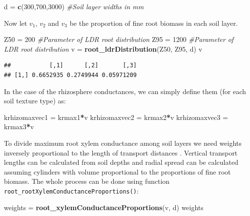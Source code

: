 \documentclass[]{book}
\newenvironment{Shaded}{\begin{snugshade}}{\end{snugshade}}
\newcommand{\KeywordTok}[1]{\textcolor[rgb]{0.13,0.29,0.53}{\textbf{#1}}}
\newcommand{\DecValTok}[1]{\textcolor[rgb]{0.00,0.00,0.81}{#1}}
\newcommand{\StringTok}[1]{\textcolor[rgb]{0.31,0.60,0.02}{#1}}
\newcommand{\CommentTok}[1]{\textcolor[rgb]{0.56,0.35,0.01}{\textit{#1}}}
\newcommand{\OperatorTok}[1]{\textcolor[rgb]{0.81,0.36,0.00}{\textbf{#1}}}
\newcommand{\NormalTok}[1]{#1}
\begin{document}
\begin{Shaded}
\begin{Highlighting}[]
\NormalTok{d =}\StringTok{ }\KeywordTok{c}\NormalTok{(}\DecValTok{300}\NormalTok{,}\DecValTok{700}\NormalTok{,}\DecValTok{3000}\NormalTok{) }\CommentTok{#Soil layer widths in mm}
\end{Highlighting}
\end{Shaded}

Now let \(v_1\), \(v_2\) and \(v_3\) be the proportion of fine root biomass in each soil layer.

\begin{Shaded}
\begin{Highlighting}[]
\NormalTok{Z50 =}\StringTok{ }\DecValTok{200} \CommentTok{#Parameter of LDR root distribution}
\NormalTok{Z95 =}\StringTok{ }\DecValTok{1200} \CommentTok{#Parameter of LDR root distribution}
\NormalTok{v =}\StringTok{ }\KeywordTok{root_ldrDistribution}\NormalTok{(Z50, Z95, d)}
\NormalTok{v}
\end{Highlighting}
\end{Shaded}

\begin{verbatim}
##           [,1]      [,2]       [,3]
## [1,] 0.6652935 0.2749944 0.05971209
\end{verbatim}

In the case of the rhizosphere conductances, we can simply define them (for each soil texture type) as:

\begin{Shaded}
\begin{Highlighting}[]
\NormalTok{krhizomaxvec1 =}\StringTok{ }\NormalTok{krmax1}\OperatorTok{*}\NormalTok{v}
\NormalTok{krhizomaxvec2 =}\StringTok{ }\NormalTok{krmax2}\OperatorTok{*}\NormalTok{v}
\NormalTok{krhizomaxvec3 =}\StringTok{ }\NormalTok{krmax3}\OperatorTok{*}\NormalTok{v}
\end{Highlighting}
\end{Shaded}

To divide maximum root xylem conductance among soil layers we need weights inversely proportional to the length of transport distances \citep{Sperry2016a}. Vertical transport lengths can be calculated from soil depths and radial spread can be calculated assuming cylinders with volume proportional to the proportions of fine root biomass. The whole process can be done using function \texttt{root\_rootXylemConductanceProportions()}:

\begin{Shaded}
\begin{Highlighting}[]
\NormalTok{weights =}\StringTok{ }\KeywordTok{root_xylemConductanceProportions}\NormalTok{(v, d)}
\NormalTok{weights}
\end{Highlighting}
\end{Shaded}
\end{document}
